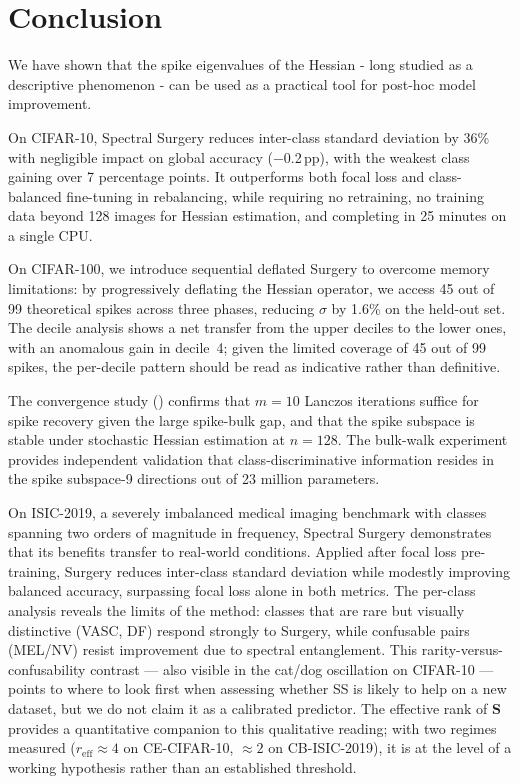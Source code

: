 \documentclass[11pt,a4paper]{article}
\newcommand{\mat}[1]{\bm{#1}}
\begin{document}
\newpage
\section{Conclusion}
\label{sec:conclusion}

We have shown that the spike eigenvalues of the Hessian - long studied
as a descriptive phenomenon - can be used as a practical tool for
post-hoc model improvement.
 
On CIFAR-10, Spectral Surgery reduces inter-class standard deviation
by 36\% with negligible impact on global accuracy ($-$0.2\,pp), with
the weakest class gaining over 7 percentage points. It outperforms
both focal loss and class-balanced fine-tuning in rebalancing, while
requiring no retraining, no training data beyond 128 images for Hessian
estimation, and completing in 25 minutes on a single CPU.
 
On CIFAR-100, we introduce sequential deflated Surgery to overcome
memory limitations: by progressively deflating the Hessian operator,
we access 45 out of 99 theoretical spikes across three phases,
reducing $\sigma$ by 1.6\% on the held-out set. The
decile analysis shows a net transfer from the upper deciles to the
lower ones, with an anomalous gain in decile~4; given the limited
coverage of 45 out of 99 spikes, the per-decile pattern should be
read as indicative rather than definitive.
 
The convergence study () confirms that $m=10$
Lanczos iterations suffice for spike recovery given the large
spike-bulk gap, and that the spike subspace is stable under
stochastic Hessian estimation at $n=128$. The bulk-walk experiment
provides independent validation that class-discriminative information
resides in the spike subspace-9 directions out of 23 million
parameters.

On ISIC-2019, a severely imbalanced medical imaging benchmark with classes spanning
two orders of magnitude in frequency, Spectral Surgery demonstrates that its benefits
transfer to real-world conditions. Applied after focal loss pre-training, Surgery reduces
inter-class standard deviation while modestly
improving balanced accuracy, surpassing focal loss alone in both
metrics.
The per-class analysis reveals the limits of the method: classes that are rare but
visually distinctive (VASC, DF) respond strongly to Surgery, while confusable pairs
(MEL/NV) resist improvement due to spectral entanglement. This rarity-versus-confusability
contrast — also visible in the cat/dog oscillation on CIFAR-10 — points to where to
look first when assessing whether SS is likely to help on a new dataset, but we do
not claim it as a calibrated predictor. The effective rank of $\mat{S}$ provides a
quantitative companion to this qualitative reading; with two regimes measured
($r_{\mathrm{eff}} \approx 4$ on CE-CIFAR-10, $\approx 2$ on CB-ISIC-2019), it is at
the level of a working hypothesis rather than an established threshold.
\end{document}
